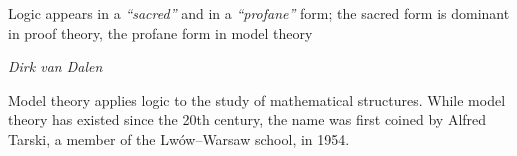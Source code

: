 \documentclass[../../../include/open-logic-section]{subfiles}
\begin{document}

\epigraph{Logic appears in a \textit{“sacred”} and in a \textit{“profane”} form;
the sacred form is dominant in proof theory, the profane form in model theory}
{\textit{Dirk van Dalen}}

Model theory applies logic to the study of mathematical structures.
While model theory has existed since the 20th century, the name was first
coined by Alfred Tarski, a member of the Lwów–Warsaw school, in 1954.
\end{document}

